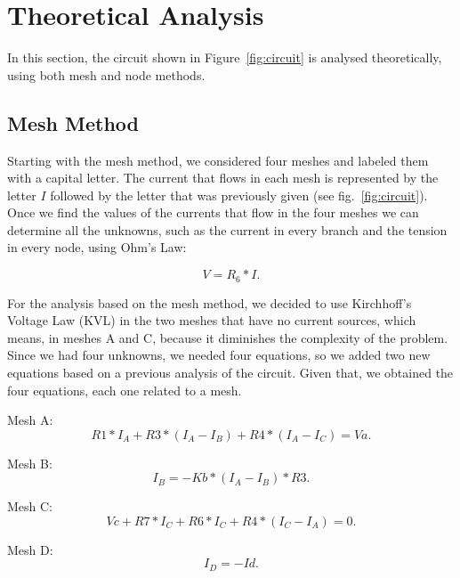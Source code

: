 \section{Theoretical Analysis}
\label{sec:analysis}

In this section, the circuit shown in Figure~\ref{fig:circuit} is analysed theoretically, using both mesh and node methods.

\subsection{Mesh Method}

Starting with the mesh method, we considered four meshes and labeled them with a capital letter. The current that flows in each mesh is represented by the letter $I$ followed by the letter that was previously given (see fig.~\ref{fig:circuit}). Once we find the values of the currents that flow in the four meshes we can determine all the unknowns, such as the current in every branch and the tension in every node, using Ohm’s Law:

\begin{equation}
  V= R_{6} *I.
  \label{eq:ohm_law}
\end{equation}

For the analysis based on the mesh method, we decided to use Kirchhoff’s Voltage Law (KVL) in the two meshes that have no current sources, which means, in meshes A and C, because it diminishes the complexity of the problem. Since we had four unknowns, we needed four equations, so we added two new equations based on a previous analysis of the circuit. Given that, we obtained the four equations, each one related to a mesh.

Mesh A:
\begin{equation}
  R1*I_A + R3*(I_A-I_B) + R4*(I_A-I_C) = Va.
  \label{eq:mesh_a}
\end{equation}

Mesh B:
\begin{equation}
  I_B = -Kb*(I_A-I_B)*R3.
  \label{eq:mesh_b}
\end{equation}

Mesh C:
\begin{equation}
  Vc + R7*I_C + R6*I_C + R4*(I_C-I_A) = 0.
  \label{eq:mesh_c}
\end{equation}

Mesh D:
\begin{equation}
  I_D = -Id.
  \label{eq:mesh_d}
\end{equation}

